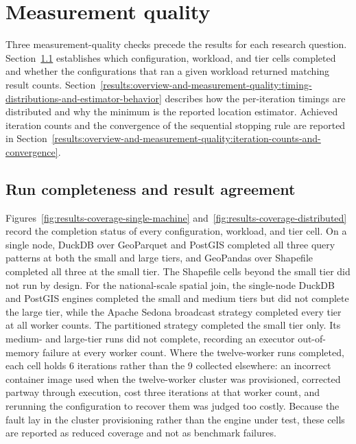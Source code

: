 \section{Measurement quality}
\label{results:overview-and-measurement-quality}

Three measurement-quality checks precede the results for each research question. Section~\ref{results:overview-and-measurement-quality:run-completeness-and-result-agreement} establishes which configuration, workload, and tier cells completed and whether the configurations that ran a given workload returned matching result counts. Section~\ref{results:overview-and-measurement-quality:timing-distributions-and-estimator-behavior} describes how the per-iteration timings are distributed and why the minimum is the reported location estimator. Achieved iteration counts and the convergence of the sequential stopping rule are reported in Section~\ref{results:overview-and-measurement-quality:iteration-counts-and-convergence}.

\subsection{Run completeness and result agreement}
\label{results:overview-and-measurement-quality:run-completeness-and-result-agreement}

Figures~\ref{fig:results-coverage-single-machine} and~\ref{fig:results-coverage-distributed} record the completion status of every configuration, workload, and tier cell. On a single node, DuckDB over GeoParquet and PostGIS completed all three query patterns at both the small and large tiers, and GeoPandas over Shapefile completed all three at the small tier. The Shapefile cells beyond the small tier did not run by design. For the national-scale spatial join, the single-node DuckDB and PostGIS engines completed the small and medium tiers but did not complete the large tier, while the Apache Sedona broadcast strategy completed every tier at all worker counts. The partitioned strategy completed the small tier only. Its medium- and large-tier runs did not complete, recording an executor out-of-memory failure at every worker count. Where the twelve-worker runs completed, each cell holds \num{6} iterations rather than the \num{9} collected elsewhere: an incorrect container image used when the twelve-worker cluster was provisioned, corrected partway through execution, cost three iterations at that worker count, and rerunning the configuration to recover them was judged too costly. Because the fault lay in the cluster provisioning rather than the engine under test, these cells are reported as reduced coverage and not as benchmark failures.

